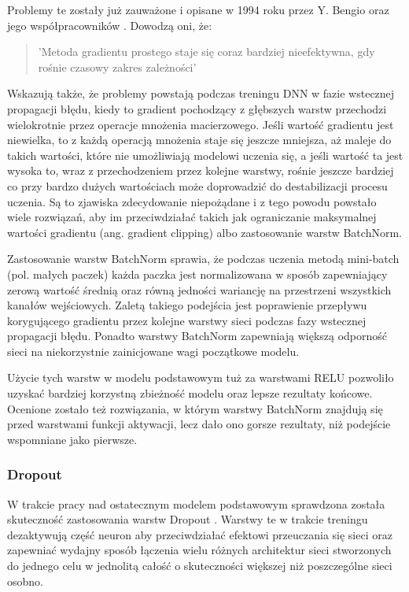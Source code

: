   Problemy te zostały już zauważone i opisane w 1994 roku przez Y. Bengio
  oraz jego współpracowników \cite{exploding_vanishing_grad}. Dowodzą oni, że:
  \begin{quote}
    'Metoda gradientu prostego staje się coraz bardziej nieefektywna, gdy
    rośnie czasowy zakres zależności'
  \end{quote}
  Wskazują także, że problemy powstają podczas treningu DNN w fazie wstecznej
  propagacji błędu, kiedy to gradient pochodzący z głębszych warstw przechodzi
  wielokrotnie przez operacje mnożenia macierzowego. Jeśli wartość gradientu
  jest niewielka, to z każdą operacją mnożenia staje się jeszcze mniejsza, aż
  maleje do takich wartości, które nie umożliwiają modelowi uczenia się, a jeśli
  wartość ta jest wysoka to, wraz z przechodzeniem przez kolejne warstwy, rośnie
  jeszcze bardziej co przy bardzo dużych wartościach może doprowadzić do
  destabilizacji procesu uczenia. Są to zjawiska zdecydowanie niepożądane i z
  tego powodu powstało wiele rozwiązań, aby im przeciwdziałać takich jak
  ograniczanie maksymalnej wartości gradientu (ang. gradient clipping) albo
  zastosowanie warstw BatchNorm.

  Zastosowanie warstw BatchNorm sprawia, że podczas uczenia metodą mini-batch
  (pol. małych paczek) każda paczka jest
  normalizowana w sposób zapewniający zerową wartość średnią oraz
  równą jedności wariancję na przestrzeni wszystkich kanałów wejściowych.
  Zaletą takiego podejścia jest poprawienie przepływu korygującego gradientu
  przez kolejne warstwy sieci podczas fazy wstecznej propagacji błędu. Ponadto
  warstwy BatchNorm zapewniają większą odporność sieci na niekorzystnie zainicjowane
  wagi początkowe modelu.

  Użycie tych warstw w modelu podstawowym tuż za warstwami RELU pozwoliło
  uzyskać bardziej korzystną zbieżność modelu oraz lepsze rezultaty końcowe.
  Ocenione zostało też rozwiązania, w którym warstwy BatchNorm znajdują się
  przed warstwami funkcji aktywacji, lecz dało ono gorsze rezultaty, niż
  podejście wspomniane jako pierwsze.

  \subsubsection{Dropout}

  W trakcie pracy nad ostatecznym modelem podstawowym sprawdzona została
  skuteczność zastosowania warstw Dropout \cite{dropout}. Warstwy te w trakcie
  treningu dezaktywują część neuron aby przeciwdziałać efektowi przeuczania
  się sieci oraz zapewniać wydajny sposób łączenia wielu różnych architektur
  sieci stworzonych do jednego celu w jednolitą całość o skuteczności większej
  niż poszczególne sieci osobno.

